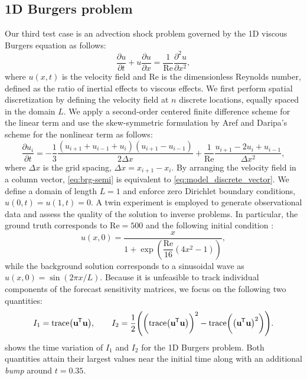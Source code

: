 \documentclass{article}
\newcommand*{\tran}{^{\mkern-1.5mu\mathsf{T}}}
\begin{document}
\subsection{1D Burgers problem}
\textcolor{rev}{Our third test case is an advection shock problem governed by the 1D viscous Burgers equation as follows:
\begin{equation}
    \dfrac{\partial u}{\partial t} + u \dfrac{\partial u}{\partial x} = \dfrac{1}{\text{Re}} \dfrac{\partial ^2 u}{\partial x^2}, \label{eq:brg}
\end{equation}
where $u(x,t)$ is the velocity field and $\text{Re}$ is the dimensionless Reynolds number, defined as the ratio of inertial effects to viscous effects. We first perform spatial discretization by defining the velocity field at $n$ discrete locations, equally spaced in the domain $L$. We apply a second-order centered finite difference scheme for the linear term and use the skew-symmetric formulation by Aref and Daripa's scheme \cite{aref1984note} for the nonlinear term as follows:
\begin{equation}
    \dfrac{\partial u_i}{\partial t} = -\dfrac{1}{3} \dfrac{(u_{i+1} + u_{i-1} + u_{i})(u_{i+1} - u_{i-1})  }{2\Delta x} + \dfrac{1}{\text{Re}} \dfrac{u_{i+1} - 2u_{i} + u_{i-1} }{\Delta x^2}, \label{eq:brg-semi}
\end{equation}
where $\Delta x$ is the grid spacing, $\Delta x = x_{i+1}-x_{i}$. By arranging the velocity field in a column vector, \cref{eq:brg-semi} is equivalent to \cref{eq:model_discrete_vector}. We define a domain of length $L=1$ and enforce zero Dirichlet boundary conditions, $u(0, t) = u(1,t) = 0$. A twin experiment is employed to generate observational data and assess the quality of the solution to inverse problems. In particular, the ground truth corresponds to $\text{Re}=500$ and the following initial condition \cite{ahmed2020long}:
\begin{equation}
    u(x, 0) = \dfrac{x}{1 + \exp{\left( \dfrac{\text{Re}}{16} \left(  4x^2 - 1 \right)  \right)} },
\end{equation}
while the background solution corresponds to a sinusoidal wave as $u(x,0) = \sin(2\pi x/L)$. Because it is unfeasible to track individual components of the forecast sensitivity matrices, we focus on the following two quantities:
\begin{equation}
    I_1 = \text{trace}\big(\mathbf{u}\tran \mathbf{u}\big), \qquad I_2 = \dfrac{1}{2} \Bigg( \bigg(\text{trace}\big(\mathbf{u}\tran \mathbf{u}\big)\bigg)^2 - \text{trace}\bigg(\big(\mathbf{u}\tran \mathbf{u}\big)^2\bigg) \Bigg).
\end{equation}
 shows the time variation of $I_1$ and $I_2$ for the 1D Burgers problem. Both quantities attain their largest values near the initial time along with an additional \emph{bump} around $t=0.35$.
}
\end{document}

